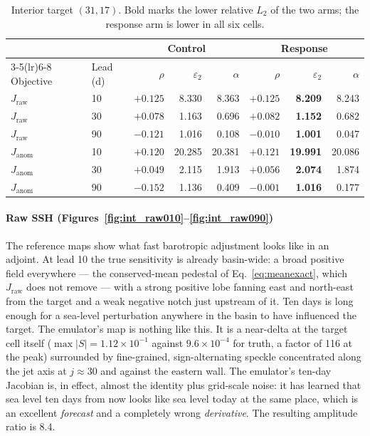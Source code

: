 \documentclass[3p,12pt]{elsarticle}
\begin{document}
\begin{table}[H]
\centering
\small
\begin{tabular}{llrrrrrr}
\toprule
& & \multicolumn{3}{c}{Control} & \multicolumn{3}{c}{Response} \\
\cmidrule(lr){3-5}\cmidrule(lr){6-8}
Objective & Lead (d) & $\rho$ & $\varepsilon_2$ & $\alpha$ & $\rho$ & $\varepsilon_2$ & $\alpha$ \\
\midrule
$J_{\mathrm{raw}}$  & 10 & $+0.125$ & 8.330 & 8.363 & $+0.125$ & \textbf{8.209} & 8.243 \\
$J_{\mathrm{raw}}$  & 30 & $+0.078$ & 1.163 & 0.696 & $+0.082$ & \textbf{1.152} & 0.682 \\
$J_{\mathrm{raw}}$  & 90 & $-0.121$ & 1.016 & 0.108 & $-0.010$ & \textbf{1.001} & 0.047 \\
$J_{\mathrm{anom}}$ & 10 & $+0.120$ & 20.285 & 20.381 & $+0.121$ & \textbf{19.991} & 20.086 \\
$J_{\mathrm{anom}}$ & 30 & $+0.049$ & 2.115 & 1.913 & $+0.056$ & \textbf{2.074} & 1.874 \\
$J_{\mathrm{anom}}$ & 90 & $-0.152$ & 1.136 & 0.409 & $-0.001$ & \textbf{1.016} & 0.177 \\
\bottomrule
\end{tabular}
\caption{Interior target $(31,17)$. Bold marks the lower relative $L_2$ of the
two arms; the response arm is lower in all six cells.}
\label{tab:interior}
\end{table}

\paragraph{Raw SSH (Figures~\ref{fig:int_raw010}--\ref{fig:int_raw090})} The
reference maps show what fast barotropic adjustment looks like in an adjoint. At
lead 10 the true sensitivity is already basin-wide: a broad positive field
everywhere --- the conserved-mean pedestal of Eq.~\eqref{eq:meanexact}, which
$J_{\mathrm{raw}}$ does not remove --- with a strong positive lobe fanning
east and north-east from the target and a weak negative notch just upstream of
it. Ten days is long enough for a sea-level perturbation anywhere in the basin to
have influenced the target. The emulator's map is nothing like this. It is a
near-delta at the target cell itself ($\max|S|=1.12\times10^{-1}$ against
$9.6\times10^{-4}$ for truth, a factor of 116 at the peak) surrounded by
fine-grained, sign-alternating speckle concentrated along the jet axis at
$j\approx30$ and against the eastern wall. The emulator's ten-day Jacobian is,
in effect, almost the identity plus grid-scale noise: it has learned that
sea level ten days from now looks like sea level today at the same place, which
is an excellent \emph{forecast} and a completely wrong \emph{derivative}. The
resulting amplitude ratio is 8.4.
\end{document}
